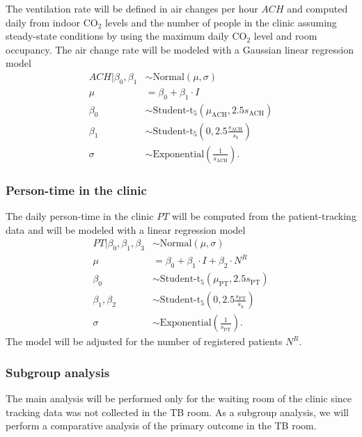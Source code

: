 \documentclass{article}
\begin{document}
The ventilation rate will be defined in air changes per hour $ACH$ and computed daily from indoor CO$_2$ levels and the number of people in the clinic assuming steady-state conditions by using the maximum daily CO$_2$ level and room occupancy\cite{Batterman2017IJERPH}. The air change rate will be modeled with a Gaussian linear regression model
\begin{align*}
    ACH | \beta_0, \beta_1 &\sim \text{Normal}(\mu, \sigma) \\
    \mu &= \beta_0 + \beta_1 \cdot I \\
    \beta_0 &\sim \text{Student-t}_5(\mu_{\text{ACH}}, 2.5s_{\text{ACH}}) \\
    \beta_1 &\sim \text{Student-t}_5\left(0, 2.5\frac{s_{\text{ACH}}}{s_{\text{I}}}\right) \\
    \sigma &\sim \text{Exponential}\left(\frac{1}{s_{\text{ACH}}}\right).
\end{align*}

\subsubsection{Person-time in the clinic} 

The daily person-time in the clinic $PT$ will be computed from the patient-tracking data and will be modeled with a linear regression model 
\begin{align*}
    PT | \beta_0, \beta_1, \beta_3 &\sim \text{Normal}(\mu, \sigma) \\
    \mu &= \beta_0 + \beta_1 \cdot I + \beta_2 \cdot N^R \\
    \beta_0 &\sim \text{Student-t}_5(\mu_{\text{PT}}, 2.5s_{\text{PT}}) \\
    \beta_1, \beta_2 &\sim \text{Student-t}_5\left(0, 2.5\frac{s_{\text{PT}}}{s_{\text{x}}}\right) \\
    \sigma &\sim \text{Exponential}\left(\frac{1}{s_{\text{PT}}}\right).
\end{align*}
The model will be adjusted for the number of registered patients $N^R$.

\subsubsection{Subgroup analysis}

The main analysis will be performed only for the waiting room of the clinic since tracking data was not collected in the TB room. As a subgroup analysis, we will perform a comparative analysis of the primary outcome in the TB room. 
\end{document}
